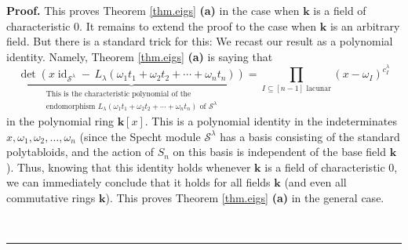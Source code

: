 \documentclass[numbers=enddot,12pt,final,onecolumn,notitlepage]{scrartcl}%
\theoremstyle{definition}
\newenvironment{proof}[1][Proof]{\noindent\textbf{#1.} }{\ \rule{0.5em}{0.5em}}
\let\prodnonlimits\prod
\renewcommand{\prod}{\prodnonlimits\limits}
\begin{document}
\begin{proof}
This proves Theorem \ref{thm.eigs} \textbf{(a)} in the case when $\mathbf{k}$
is a field of characteristic $0$. It remains to extend the proof to the case
when $\mathbf{k}$ is an arbitrary field. But there is a standard trick for
this: We recast our result as a polynomial identity. Namely, Theorem
\ref{thm.eigs} \textbf{(a)} is saying that
\[
\underbrace{\det\left(  x\operatorname*{id}\nolimits_{\mathcal{S}^{\lambda}%
}-\,L_{\lambda}\left(  \omega_{1}t_{1}+\omega_{2}t_{2}+\cdots+\omega_{n}%
t_{n}\right)  \right)  }_{\substack{\text{This is the characteristic
polynomial of the}\\\text{endomorphism }L_{\lambda}\left(  \omega_{1}%
t_{1}+\omega_{2}t_{2}+\cdots+\omega_{n}t_{n}\right)  \text{ of }%
\mathcal{S}^{\lambda}}}=\prod_{I\subseteq\left[  n-1\right]  \text{ lacunar}%
}\left(  x-\omega_{I}\right)  ^{c_{I}^{\lambda}}%
\]
in the polynomial ring $\mathbf{k}\left[  x\right]  $. This is a polynomial
identity in the indeterminates $x,\omega_{1},\omega_{2},\ldots,\omega_{n}$
(since the Specht module $\mathcal{S}^{\lambda}$ has a basis consisting of the
standard polytabloids, and the action of $S_{n}$ on this basis is independent
of the base field $\mathbf{k}$). Thus, knowing that this identity holds
whenever $\mathbf{k}$ is a field of characteristic $0$, we can immediately
conclude that it holds for all fields $\mathbf{k}$ (and even all commutative
rings $\mathbf{k}$). This proves Theorem \ref{thm.eigs} \textbf{(a)} in the
general case. \medskip


\end{proof}
\end{document}

